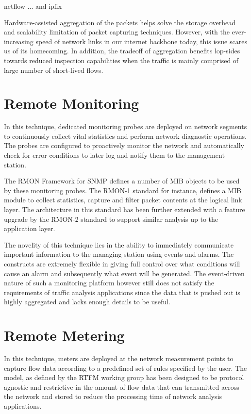 netflow {...} and ipfix \cite{...} 

Hardware-assisted aggregation of the packets helps solve the storage overhead and scalability limitation of packet capturing techniques. However, with the ever-increasing  speed of network links in our internet backbone today, this issue scares us of its homecoming. In addition, the tradeoff of aggregation benefits lop-sides towards reduced inspection capabilities when the traffic is mainly comprised of large number of short-lived flows. 


\section{Remote Monitoring}\label{sec:remote-monitoring}
In this technique, dedicated monitoring probes are deployed on network segments to continuously collect vital statistics and perform network diagnostic operations. The probes are configured to proactively monitor the network and automatically check for error conditions to later log and notify them to the management station. 

The \ac{RMON} Framework \cite{rfc3577} for \ac{SNMP} \cite{rfc1157} defines a number of \ac{MIB} objects to be used by these monitoring probes. The \ac{RMON}-1 standard \cite{rfc2819} for instance, defines a \ac{MIB}  module to collect statistics, capture and filter packet contents at the logical link layer. The architecture in this standard has been further extended with a feature upgrade by the \ac{RMON}-2 standard \cite{rfc4502} to support similar analysis up to the application layer.

The novelity of this technique lies in the ability to immediately communicate important information to the managing station using events and alarms. The constructs are extremely flexible in giving full control over what conditions will cause an alarm  and subsequently what event will be generated. The event-driven nature of such a monitoring platform however still does not satisfy the requirements of traffic analysis applications since the data that is pushed out is highly aggregated and lacks enough details to be useful. 

\section{Remote Metering}\label{sec:remote-metering}
In this technique, meters are deployed at the network measurement points to capture flow data according to a predefined set of rules specified by the user. The model, as defined by the \ac{RTFM} working group \cite{rfc2722} has been designed to be protocol agnostic and restrictive in the amount of flow data that can transmitted across the network and stored to reduce the processing time of network analysis applications. 

